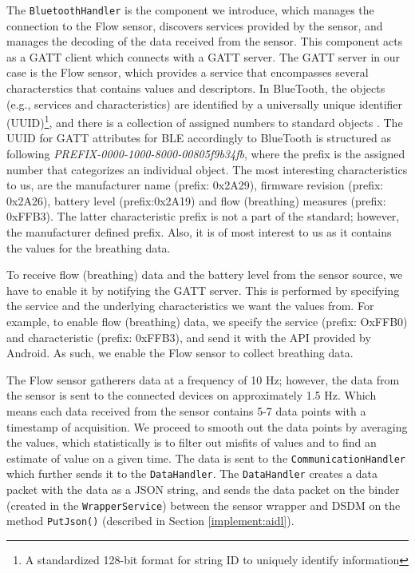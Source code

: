The \verb|BluetoothHandler| is the component we introduce, which manages the connection to the Flow sensor, discovers services provided by the sensor, and manages the decoding of the data received from the sensor. This component acts as a GATT client which connects with a GATT server. The GATT server in our case is the Flow sensor, which provides a service that encompasses several characterstics that contains values and descriptors. In BlueTooth, the objects (e.g., services and characteristics) are identified by a universally unique identifier (UUID)\footnote{A standardized 128-bit format for string ID to uniquely identify information}, and there is a collection of assigned numbers to standard objects \cite{uuid}. The UUID for GATT attributes for BLE accordingly to BlueTooth is structured as following \textit{PREFIX-0000-1000-8000-00805f9b34fb}, where the prefix is the assigned number that categorizes an individual object. The most interesting characteristics to us, are the manufacturer name (prefix: 0x2A29), firmware revision (prefix: 0x2A26), battery level (prefix:0x2A19) and flow (breathing) measures (prefix: 0xFFB3). The latter characteristic prefix is not a part of the standard; however, the manufacturer defined prefix. Also, it is of most interest to us as it contains the values for the breathing data. 

To receive flow (breathing) data and the battery level from the sensor source, we have to enable it by notifying the GATT server. This is performed by specifying the service and the underlying characteristics we want the values from. For example, to enable flow (breathing) data, we specify the service (prefix: OxFFB0) and characteristic (prefix: 0xFFB3), and send it with the API provided by Android.  As such, we enable the Flow sensor to collect breathing data. 

The Flow sensor gatherers data at a frequency of 10 Hz; however, the data from the sensor is sent to the connected devices on approximately 1.5 Hz. Which means each data received from the sensor contains 5-7 data points with a timestamp of acquisition. We proceed to smooth out the data points by averaging the values, which statistically is to filter out misfits of values and to find an estimate of value on a given time. The data is sent to the \verb|CommunicationHandler| which further sends it to the \verb|DataHandler|. The \verb|DataHandler| creates a data packet with the data as a JSON string, and sends the data packet on the binder (created in the \verb|WrapperService|) between the sensor wrapper and DSDM on the method \verb|PutJson()| (described in Section \ref{implement:aidl}). 

